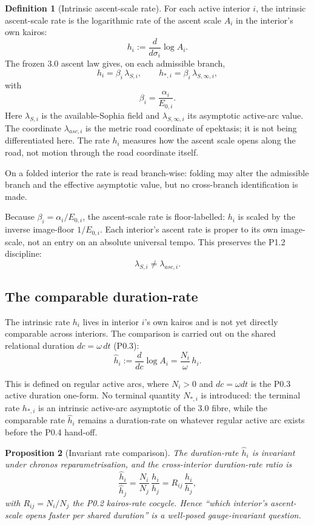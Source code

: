 \documentclass[11pt,a4paper]{article}
\def\mathfrak#1{#1}%
\def\mathrm#1{#1}%
\def\emph#1{#1}%
\theoremstyle{definition}
\newtheorem{definition}{Definition}[section]
\theoremstyle{plain}
\newtheorem{proposition}[definition]{Proposition}
\theoremstyle{remark}
\begin{document}
\begin{definition}[Intrinsic ascent-scale rate]\label{def:rate}
For each active interior \(i\), the \emph{intrinsic ascent-scale rate} is the
logarithmic rate of the ascent scale \(A_i\) in the interior's own kairos:
\[
\boxed{\;
h_i
:=
\frac{d}{d\sigma_i}\log A_i.
\;}
\]
The frozen 3.0 ascent law gives, on each admissible branch,
\[
\boxed{\;
h_i=\beta_i\,\lambda_{S,i},
\qquad
h_{*,i}=\beta_i\,\lambda_{S,\infty,i},
\;}
\]
with
\[
\beta_i=\frac{\alpha_i}{E_{0,i}}.
\]
Here \(\lambda_{S,i}\) is the available-Sophia field and
\(\lambda_{S,\infty,i}\) its asymptotic active-arc value. The coordinate
\(\lambda_{\mathrm{asc},i}\) is the metric road coordinate of epektasis; it is not
being differentiated here. The rate \(h_i\) measures how the ascent scale opens
along the road, not motion through the road coordinate itself.

On a folded interior the rate is read branch-wise: folding may alter the
admissible branch and the effective asymptotic value, but no cross-branch
identification is made.
\end{definition}

Because \(\beta_i=\alpha_i/E_{0,i}\), the ascent-scale rate is floor-labelled:
\(h_i\) is scaled by the inverse image-floor \(1/E_{0,i}\). Each interior's ascent
rate is proper to its own image-scale, not an entry on an absolute universal tempo.
This preserves the P1.2 discipline:
\[
\lambda_{S,i}\neq\lambda_{\mathrm{asc},i}.
\]

\subsection{The comparable duration-rate}

The intrinsic rate \(h_i\) lives in interior \(i\)'s own kairos and is not yet directly
comparable across interiors. The comparison is carried out on the shared relational
duration \(d\mathfrak c=\omega\,dt\) (P0.3):
\[
\boxed{\;
\hat h_i
:=
\frac{d}{d\mathfrak c}\log A_i
=
\frac{N_i}{\omega}\,h_i.
\;}
\]

This is defined on regular active arcs, where \(N_i>0\) and
\(d\mathfrak c=\omega dt\) is the P0.3 active duration one-form. No terminal
quantity \(N_{*,i}\) is introduced: the terminal rate \(h_{*,i}\) is an
intrinsic active-arc asymptotic of the 3.0 fibre, while the comparable rate
\(\hat h_i\) remains a duration-rate on whatever regular active arc exists before
the P0.4 hand-off.

\begin{proposition}[Invariant rate comparison]\label{prop:ratecompare}
The duration-rate \(\hat h_i\) is invariant under chronos reparametrisation, and
the cross-interior duration-rate ratio is
\[
\frac{\hat h_i}{\hat h_j}
=
\frac{N_i}{N_j}\,\frac{h_i}{h_j}
=
R_{ij}\,\frac{h_i}{h_j},
\]
with \(R_{ij}=N_i/N_j\) the P0.2 kairos-rate cocycle. Hence ``which interior's
ascent-scale opens faster per shared duration'' is a well-posed gauge-invariant
question.
\end{proposition}
\end{document}
